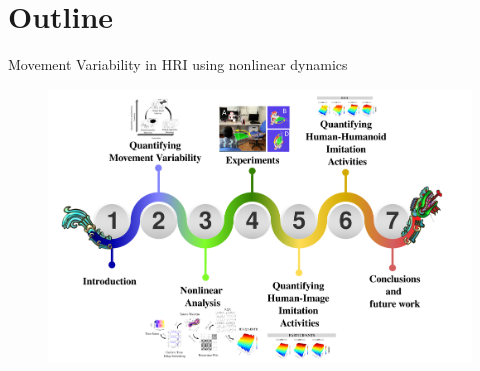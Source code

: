 \section{Outline}

{
\begin{frame}{Movement Variability in HRI using nonlinear dynamics}
    \vspace{-00mm}
      \begin{figure}
        \centering
        \includegraphics[width=0.8\linewidth]{./figs/oa-thesis/versions/drawing-v00.png}
        \caption{}
      \end{figure}
\end{frame}
}

